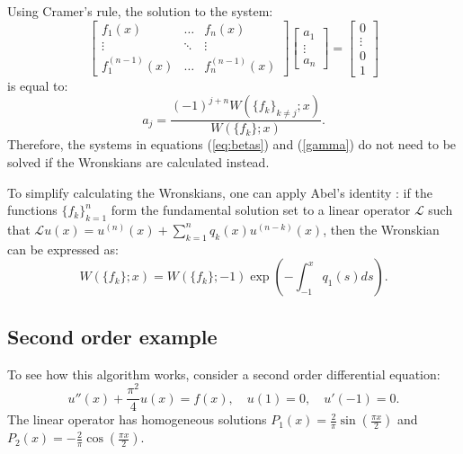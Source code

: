 \documentclass{sfuthesis}
\begin{document}
Using Cramer's rule, the solution to the system:
\begin{equation}
\begin{bmatrix} f_1(x) & \dots & f_n(x) \\ \vdots & \ddots & \vdots \\ f^{(n-1)}_1(x) & \dots & f_n^{(n-1)}(x) \end{bmatrix} 
\begin{bmatrix} a_1 \\ \vdots \\ a_n \end{bmatrix} =
\begin{bmatrix} 0 \\ \vdots \\ 0 \\ 1 \end{bmatrix}
\end{equation}
is equal to:
\begin{equation} \label{eq:Wronskian coeffs}
a_j = \frac{ (-1)^{j+n} W( \{ f_k \}_{k \neq j} ; x) }{ W( \{ f_k \} ; x ) } .
\end{equation}
Therefore, the systems in equations (\ref{eq:betas}) and (\ref{gamma}) do not need to be solved if the Wronskians are calculated instead.


To simplify calculating the Wronskians, one can apply Abel's identity \cite{Abel, BoyceDiPrima}:
if the functions $\{ f_k \}_{k=1}^n$ form the fundamental solution set to a linear operator $\mathcal{L}$ such that 
$\mathcal{L} u(x) = u^{(n)}(x) + \sum_{k=1}^n q_k(x) u^{(n - k)}(x)$, then the Wronskian can be expressed as:
\begin{equation}
W(\{f_k\}; x) = W(\{f_k\}; -1) \exp \left ({ - \int_{-1}^x q_1(s) ds } \right ).
\end{equation}

\subsection{Second order example} \label{ssec:IOMex}

To see how this algorithm works, consider a second order differential equation:
\begin{equation}
u''(x) + \frac{\pi^2}{4} u(x) = f(x), \quad u(1) = 0, \quad u'(-1) = 0.
\end{equation}
The linear operator has homogeneous solutions $P_1(x) = \frac{2}{\pi} \sin \left (\frac{\pi x}{2} \right )$ and $P_2(x) = -\frac{2}{\pi} \cos \left (\frac{\pi x}{2} \right )$.
\end{document}
